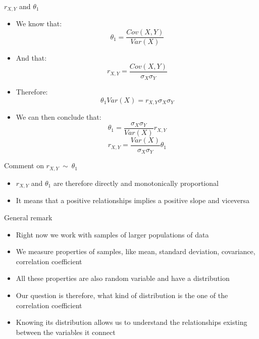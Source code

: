 \documentclass{beamer}
\begin{document}
\begin{frame}
{\centerline{$ r_{X,Y} $ and $\theta_1$}}
\begin{itemize}
\item We know that:
$$ \theta_1  = \frac { Cov(X,Y)} { Var(X) } $$
\item And that:
$$r_{X,Y} = \frac{Cov(X,Y)}{\sigma_X\sigma_Y}$$
\item Therefore:
$$ \theta_1  Var(X) = r_{X,Y}  \sigma_X\sigma_Y $$
\item We can then conclude that:
$$ \theta_1  = \frac{\sigma_X\sigma_Y}{Var(X)} r_{X,Y}   $$
$$ r_{X,Y}   = \frac{Var(X)}{\sigma_X\sigma_Y} \theta_1  $$

\end{itemize}

\end{frame}


\begin{frame}
{\centerline{Comment on $ r_{X,Y} ~ \sim ~ \theta_1$}}
\begin{itemize}
\item $ r_{X,Y} $ and $\theta_1$ are therefore directly and monotonically proportional
\item It means that a positive relationships implies a positive slope and viceversa
\end{itemize}

\end{frame}




\begin{frame}
{\centerline{General remark}}

\begin{itemize}
\item Right now we work with samples of larger populations of data
\item We measure properties of samples, like mean, standard deviation, covariance, correlation coefficient
\item All these properties are also random variable and have a distribution
\item Our question is therefore, what kind of distribution is the one of the correlation coefficient
\item Knowing its distribution allows us to understand the relationships existing between the variables it connect
\end{itemize}


\end{frame}
\end{document}
